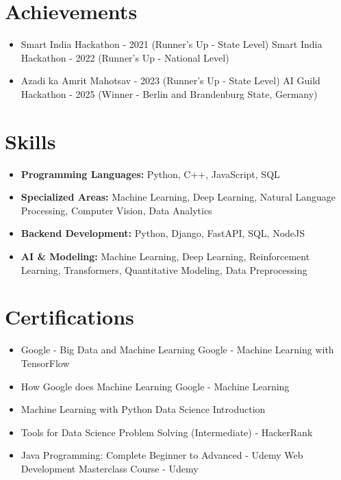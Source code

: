 \documentclass[a4paper,10pt]{article}
\begin{document}
\section*{Achievements}
\begin{itemize}
\item Smart India Hackathon - 2021 (Runner's Up - State Level) \hfill Smart India Hackathon - 2022 (Runner's Up - National Level)
\item Azadi ka Amrit Mahotsav - 2023 (Runner's Up - State Level) \hfill AI Guild Hackathon - 2025 (Winner - Berlin and Brandenburg State, Germany)
\end{itemize}

\section*{Skills}
\begin{itemize}
  \item \textbf{Programming Languages:} Python, C++, JavaScript, SQL
  \item \textbf{Specialized Areas:} Machine Learning, Deep Learning, Natural Language Processing, Computer Vision, Data Analytics
  \item \textbf{Backend Development:} Python, Django, FastAPI, SQL, NodeJS
  \item \textbf{AI \& Modeling:} Machine Learning, Deep Learning, Reinforcement Learning, Transformers, Quantitative Modeling, Data Preprocessing
\end{itemize}

\section*{Certifications}
\begin{itemize}
\item Google - Big Data and Machine Learning \hfill Google - Machine Learning with TensorFlow
\item How Google does Machine Learning \hfill Google - Machine Learning
\item Machine Learning with Python \hfill Data Science Introduction
\item Tools for Data Science \hfill Problem Solving (Intermediate) - HackerRank
\item Java Programming: Complete Beginner to Advanced - Udemy \hfill Web Development Masterclass Course - Udemy
\end{itemize}
\end{document}
